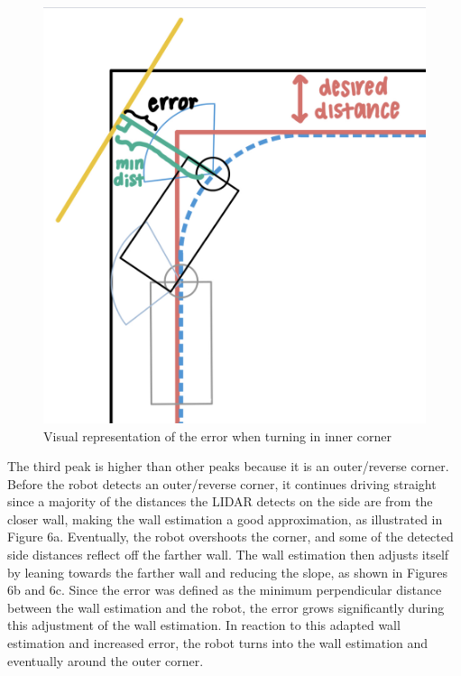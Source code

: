 \documentclass{article}
\begin{document}
\begin{figure}[h]
\begin{center}
\includegraphics[width=.5\textwidth,trim={0 0 0 2cm},clip]{imgs/inner_corner.jpg} %
\caption{Visual representation of the error when turning in inner corner}
\end{center}
\end{figure}

The third peak is higher than other peaks because it is an outer/reverse corner. Before the robot detects an outer/reverse corner, it continues driving straight since a majority of the distances the LIDAR detects on the side are from the closer wall, making the wall estimation a good approximation, as illustrated in Figure 6a. Eventually, the robot overshoots the corner, and some of the detected side distances reflect off the farther wall. The wall estimation then adjusts itself by leaning towards the farther wall and reducing the slope, as shown in Figures 6b and 6c. Since the error was defined as the minimum perpendicular distance between the wall estimation and the robot, the error grows significantly during this adjustment of the wall estimation. In reaction to this adapted wall estimation and increased error, the robot turns into the wall estimation and eventually around the outer corner. \\
\end{document}
